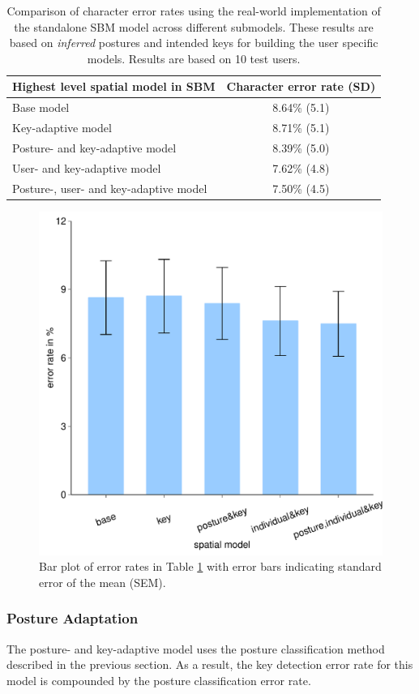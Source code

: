 \documentclass{sigchi}
\newcommand\tabhead[1]{\small\textbf{#1}}
\begin{document}
\begin{table}[tb]
  \centering
  \begin{tabular}{|l|c|}
  \hline
  \tabhead{Highest level spatial model in SBM} &  
  \multicolumn{1}{|p{0.2\columnwidth}|}{\centering\tabhead{Character error rate
  (SD)}}
  \\
  \hline
 Base model & 8.64\% (5.1)\\
  \hline
  Key-adaptive model & 8.71\% (5.1) \\
  \hline
    \multicolumn{1}{|p{0.7\columnwidth}|}{Posture- and key-adaptive model} &
    8.39\% (5.0)\\
  \hline
  User- and key-adaptive model  & 7.62\% (4.8)
  \\
  \hline
  Posture-, user- and key-adaptive model &  7.50\% (4.5)
  \\
  \hline
  \end{tabular}
  \caption{Comparison of character error rates using the real-world implementation of the standalone SBM model across different submodels.  
  These results are based on \textit{inferred} postures and intended keys for building the user specific models. Results are based on 10 test users.}
  \label{tab:off-device}
\end{table}

\begin{figure}[tb]
  \centering
  \includegraphics[width=0.8\columnwidth,
  height=0.6\columnwidth]{figures/error-rates2.pdf}
  \caption{Bar plot of error rates in Table \ref{tab:off-device} with error
  bars indicating standard error of the mean (SEM).}
  \label{fig:error-bar2}
\end{figure}

\subsubsection{Posture Adaptation}\label{sec:off-device-posture}
The posture- and key-adaptive model uses the posture classification
method described in the previous section. As a result, the
key detection error rate for this model is compounded by the posture
classification error rate. 
\end{document}
